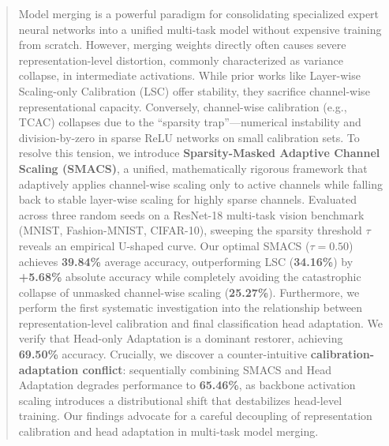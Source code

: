 \documentclass{article}
\theoremstyle{plain}
\theoremstyle{definition}
\theoremstyle{remark}
\begin{document}

\printAffiliationsAndNotice{}  %

\begin{abstract}
  Model merging is a powerful paradigm for consolidating specialized expert neural networks into a unified multi-task model without expensive training from scratch. However, merging weights directly often causes severe representation-level distortion, commonly characterized as variance collapse, in intermediate activations. While prior works like Layer-wise Scaling-only Calibration (LSC) offer stability, they sacrifice channel-wise representational capacity. Conversely, channel-wise calibration (e.g., TCAC) collapses due to the ``sparsity trap''---numerical instability and division-by-zero in sparse ReLU networks on small calibration sets. To resolve this tension, we introduce \textbf{Sparsity-Masked Adaptive Channel Scaling (SMACS)}, a unified, mathematically rigorous framework that adaptively applies channel-wise scaling only to active channels while falling back to stable layer-wise scaling for highly sparse channels. Evaluated across three random seeds on a ResNet-18 multi-task vision benchmark (MNIST, Fashion-MNIST, CIFAR-10), sweeping the sparsity threshold $\tau$ reveals an empirical U-shaped curve. Our optimal SMACS ($\tau=0.50$) achieves \textbf{39.84\%} average accuracy, outperforming LSC (\textbf{34.16\%}) by \textbf{+5.68\%} absolute accuracy while completely avoiding the catastrophic collapse of unmasked channel-wise scaling (\textbf{25.27\%}). Furthermore, we perform the first systematic investigation into the relationship between representation-level calibration and final classification head adaptation. We verify that Head-only Adaptation is a dominant restorer, achieving \textbf{69.50\%} accuracy. Crucially, we discover a counter-intuitive \textbf{calibration-adaptation conflict}: sequentially combining SMACS and Head Adaptation degrades performance to \textbf{65.46\%}, as backbone activation scaling introduces a distributional shift that destabilizes head-level training. Our findings advocate for a careful decoupling of representation calibration and head adaptation in multi-task model merging.
\end{abstract}
\end{document}
